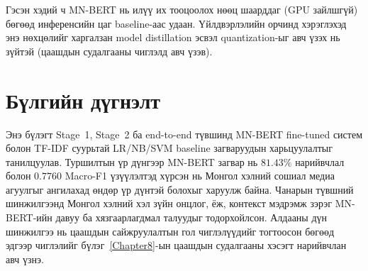 Гэсэн хэдий ч MN-BERT нь илүү их тооцоолох нөөц шаарддаг (GPU зайлшгүй) бөгөөд
инференсийн цаг baseline-аас удаан. Үйлдвэрлэлийн орчинд хэрэглэхэд энэ
нөхцөлийг харгалзан model distillation эсвэл quantization-ыг авч үзэх нь
зүйтэй (цаашдын судалгааны чиглэлд авч үзэв).

\section{Бүлгийн дүгнэлт}

Энэ бүлэгт Stage~1, Stage~2 ба end-to-end түвшинд MN-BERT fine-tuned систем
болон TF-IDF суурьтай LR/NB/SVM baseline загваруудын харьцуулалтыг танилцуулав.
Туршилтын үр дүнгээр MN-BERT загвар нь $81.43\%$ нарийвчлал болон $0.7760$ Macro-F1
үзүүлэлтэд хүрсэн нь Монгол хэлний сошиал медиа агуулгыг ангилахад өндөр
үр дүнтэй болохыг харуулж байна. Чанарын түвшний шинжилгээнд Монгол хэлний
хэл зүйн онцлог, ёж, контекст мэдрэмж зэрэг MN-BERT-ийн давуу ба хязгаарлагдмал
талуудыг тодорхойлсон. Алдааны дүн шинжилгээ нь цаашдын сайжруулалтын гол
чиглэлүүдийг тогтоосон бөгөөд эдгээр чиглэлийг бүлэг~\ref{Chapter8}-ын цаашдын
судалгааны хэсэгт нарийвчлан авч үзнэ.
